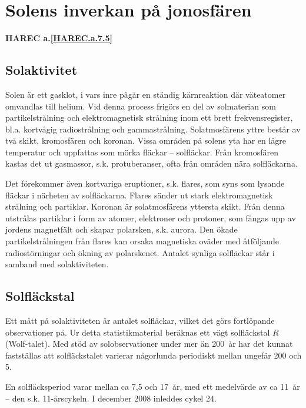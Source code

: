\section[Solens inverkan]{Solens inverkan på jonosfären}
\textbf{
HAREC a.\ref{HAREC.a.7.5}\label{myHAREC.a.7.5}
}

\subsection{Solaktivitet}

Solen är ett gasklot, i vars inre pågår en ständig kärnreaktion där
väteatomer omvandlas till helium.
Vid denna process frigörs en del av solmaterian som partikelstrålning och
elektromagnetisk strålning inom ett brett frekvensregister, bl.a. kortvågig
radiostrålning och gammastrålning.
Solatmosfärens yttre består av två skikt, kromosfären och koronan.
Vissa områden på solens yta har en lägre temperatur och uppfattas som mörka
fläckar -- solfläckar.
Från kromosfären kastas det ut gasmassor, s.k. protuberanser, ofta från områden
nära solfläckarna.

Det förekommer även kortvariga eruptioner, s.k. flares, som syns som
lysande fläckar i närheten av solfläckarna.
Flares sänder ut stark elektromagnetisk strålning och partiklar.
Koronan är solatmosfärens yttersta skikt.
Från denna utstrålas partiklar i form av atomer, elektroner och protoner, som
fångas upp av jordens magnetfält och skapar polarsken, s.k. aurora.
Den ökade partikelstrålningen från flares kan orsaka magnetiska oväder med
åtföljande radiostörningar och ökning av polarskenet.
Antalet synliga solfläckar står i samband med solaktiviteten.

\subsection{Solfläckstal}

Ett mått på solaktiviteten är antalet solfläckar, vilket det görs
fortlöpande observationer på.
Ur detta statistikmaterial beräknas ett vägt solfläckstal \(R\) (Wolf-talet).
Med stöd av solobservationer under mer än 200~år har det kunnat fastställas att
solfläckstalet varierar någorlunda periodiskt mellan ungefär 200 och 5.

En solfläcksperiod varar mellan ca 7,5 och 17~år, med ett medelvärde
av ca 11~år -- den s.k. 11-årscykeln.
I december 2008 inleddes cykel 24.

